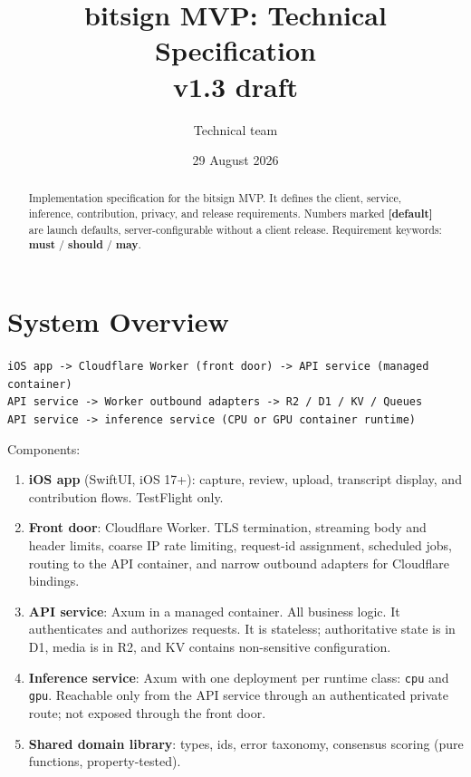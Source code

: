 \documentclass[11pt]{article}
\title{\textbf{bitsign MVP: Technical Specification} \\ \large v1.3 draft}
\author{Technical team}
\date{29 August 2026}
\newcommand{\code}[1]{\texttt{#1}}
\begin{document}
\maketitle

\begin{abstract}
\noindent Implementation specification for the bitsign MVP. It defines the client,
service, inference, contribution, privacy, and release requirements. Numbers marked
\textbf{[default]} are launch defaults, server-configurable without a client release.
Requirement keywords: \textbf{must} / \textbf{should} / \textbf{may}.
\end{abstract}

\setcounter{tocdepth}{2}
\tableofcontents

\section{System Overview}

\begin{center}
\code{iOS app -> Cloudflare Worker (front door) -> API service (managed container)}\\
\code{API service -> Worker outbound adapters -> R2 / D1 / KV / Queues}\\
\code{API service -> inference service (CPU or GPU container runtime)}
\end{center}

Components:

\begin{enumerate}[nosep]
  \item \textbf{iOS app} (SwiftUI, iOS 17+): capture, review, upload, transcript
        display, and contribution flows. TestFlight only.
  \item \textbf{Front door}: Cloudflare Worker. TLS termination,
        streaming body and header limits, coarse IP rate limiting, request-id
        assignment, scheduled jobs, routing to the API container, and narrow
        outbound adapters for Cloudflare bindings.
  \item \textbf{API service}: Axum in a managed container. All business logic.
        It authenticates and authorizes requests. It is stateless; authoritative
        state is in D1, media is in R2, and KV contains non-sensitive configuration.
  \item \textbf{Inference service}: Axum with one deployment per runtime class:
        \code{cpu} and \code{gpu}. Reachable only from the API service through an
        authenticated private route; not exposed through the front door.
  \item \textbf{Shared domain library}: types, ids,
        error taxonomy, consensus scoring (pure functions, property-tested).
\end{enumerate}
\end{document}
